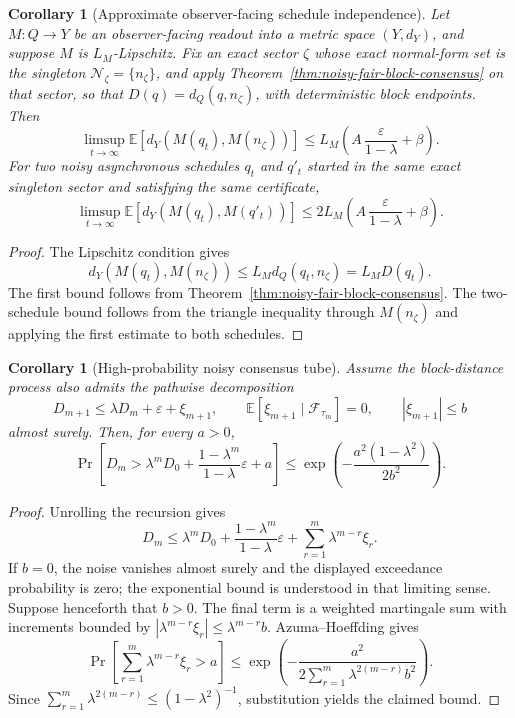 \documentclass[11pt]{article}
\newtheorem{corollary}[theorem]{Corollary}
\theoremstyle{remark}
\theoremstyle{plain}
\begin{document}
\begin{corollary}[Approximate observer-facing schedule independence]
\label{cor:approx-schedule-independence}
Let \(M:Q\to Y\) be an observer-facing readout into a metric space \((Y,d_Y)\), and suppose \(M\)
is \(L_M\)-Lipschitz. Fix an exact sector \(\zeta\) whose exact normal-form set is the singleton
\(\mathcal N_\zeta=\{n_\zeta\}\), and apply Theorem~\ref{thm:noisy-fair-block-consensus} on that
sector, so that \(D(q)=d_Q(q,n_\zeta)\), with deterministic block endpoints.
Then
\[
\limsup_{t\to\infty}
\mathbb E\!\left[
d_Y(M(q_t),M(n_\zeta))
\right]
\le
L_M\left(A\,\frac{\varepsilon}{1-\lambda}+\beta\right).
\]
For two noisy asynchronous schedules \(q_t\) and \(q'_t\) started in the same exact singleton
sector and satisfying the same certificate,
\[
\limsup_{t\to\infty}
\mathbb E\!\left[
d_Y(M(q_t),M(q'_t))
\right]
\le
2L_M\left(A\,\frac{\varepsilon}{1-\lambda}+\beta\right).
\]
\end{corollary}

\begin{proof}
The Lipschitz condition gives
\[
d_Y(M(q_t),M(n_\zeta))
\le
L_M d_Q(q_t,n_\zeta)
=
L_M D(q_t).
\]
The first bound follows from Theorem~\ref{thm:noisy-fair-block-consensus}. The two-schedule bound
follows from the triangle inequality through \(M(n_\zeta)\) and applying the first estimate to
both schedules.
\end{proof}

\begin{corollary}[High-probability noisy consensus tube]
\label{cor:high-prob-noisy-tube}
Assume the block-distance process also admits the pathwise decomposition
\[
D_{m+1}
\le
\lambda D_m+\varepsilon+\xi_{m+1},
\qquad
\mathbb E[\xi_{m+1}\mid\mathcal F_{\tau_m}]=0,
\qquad
|\xi_{m+1}|\le b
\]
almost surely. Then, for every \(a>0\),
\[
\Pr\!\left[
D_m>
\lambda^mD_0
+
\frac{1-\lambda^m}{1-\lambda}\varepsilon
+
a
\right]
\le
\exp\!\left(
-\frac{a^2(1-\lambda^2)}{2b^2}
\right).
\]
\end{corollary}

\begin{proof}
Unrolling the recursion gives
\[
D_m
\le
\lambda^mD_0
+
\frac{1-\lambda^m}{1-\lambda}\varepsilon
+
\sum_{r=1}^{m}\lambda^{m-r}\xi_r.
\]
If \(b=0\), the noise vanishes almost surely and the displayed exceedance
probability is zero; the exponential bound is understood in that limiting
sense. Suppose henceforth that \(b>0\). The final term is a weighted martingale sum with increments bounded by
\(|\lambda^{m-r}\xi_r|\le\lambda^{m-r}b\). Azuma--Hoeffding gives
\[
\Pr\!\left[
\sum_{r=1}^{m}\lambda^{m-r}\xi_r>a
\right]
\le
\exp\!\left(
-\frac{a^2}{2\sum_{r=1}^{m}\lambda^{2(m-r)}b^2}
\right).
\]
Since \(\sum_{r=1}^{m}\lambda^{2(m-r)}\le(1-\lambda^2)^{-1}\), substitution yields the claimed
bound.
\end{proof}
\end{document}
